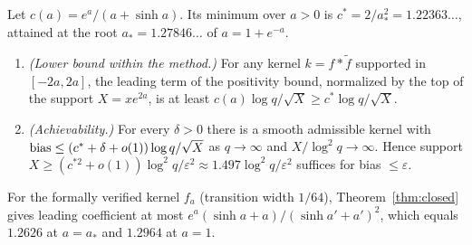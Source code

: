 \begin{corollary}[informal]\label{cor:asymp}
Let $c(a)=e^a/(a+\sinh a)$. Its minimum over $a>0$ is $c^*=2/a_*^2=1.22363\ldots$, attained at the root
$a_*=1.27846\ldots$ of $a=1+e^{-a}$.
\begin{enumerate}
\item \emph{(Lower bound within the method.)} For any kernel $k=f*\tilde f$ supported in $[-2a,2a]$, the leading
  term of the positivity bound, normalized by the top of the support $X=xe^{2a}$, is at least
  $c(a)\log q/\sqrt X\ge c^*\log q/\sqrt X$.
\item \emph{(Achievability.)} For every $\delta>0$ there is a smooth admissible kernel with
  $\operatorname{bias}\le(c^*+\delta+o(1))\log q/\sqrt X$ as $q\to\infty$ and $X/\log^2q\to\infty$. Hence support
  $X\ge(c^{*2}+o(1))\log^2q/\varepsilon^2\approx1.497\log^2q/\varepsilon^2$ suffices for bias $\le\varepsilon$.
\end{enumerate}
For the formally verified kernel $f_a$ (transition width $1/64$), Theorem~\ref{thm:closed} gives leading
coefficient at most $e^a(\sinh a+a)/(\sinh a'+a')^2$, which equals $1.2626$ at $a=a_*$ and $1.2964$ at $a=1$.
\end{corollary}
